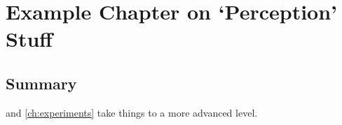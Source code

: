 
\def\chapdir{./ChapterPerception}

\chapter{Example Chapter on `Perception' Stuff}\label{ch:perception}








\section{Summary}

 and \autoref{ch:experiments} take things to a more advanced level.
